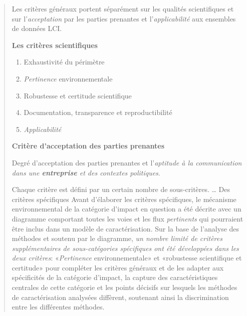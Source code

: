   \blockcquote[traduction, section 2.1.1 p23/159 du pdf (pagination p.7-8)]{jrc_ilcd_2011}{
  Les critères généraux portent séparément sur les qualités scientifiques et sur l'\emph{acceptation} par les parties prenantes et l'\emph{applicabilité} aux ensembles de données LCI.
  
  \textbf{Les critères scientifiques}
  \begin{enumerate}
    \item Exhaustivité du périmètre
    \item \emph{Pertinence} environnementale
    \item Robustesse et certitude scientifique
    \item Documentation, transparence et reproductibilité
    \item \emph{Applicabilité}
  \end{enumerate}
  
  \textbf{Critère d'acceptation des parties prenantes}
  
  Degré d'acceptation des parties prenantes et l'\emph{aptitude à la communication dans une \textbf{entreprise} et des contextes politiques}.
  
  Chaque critère est défini par un certain nombre de sous-critères.
  \ldots
  Des critères spécifiques
  Avant d'élaborer les critères spécifiques, le mécanisme environnemental de la catégorie d'impact en question a été décrite avec un diagramme comportant toutes les voies et les flux \emph{pertinents} qui pourraient être inclus dans un modèle de caractérisation.
  Sur la base de l'analyse des méthodes et soutenu par le diagramme, \emph{un nombre limité de critères supplémentaires de sous-catégories spécifiques ont été développées dans les deux critères}:
  «\emph{Pertinence} environnementale» et «robustesse scientifique et certitude» pour compléter les critères généraux et de les adapter aux spécificités de la catégorie d'impact, la capture des caractéristiques centrales de cette catégorie et les points décisifs sur lesquels les méthodes de caractérisation analysées diffèrent, soutenant ainsi la discrimination entre les différentes méthodes.
  
}

